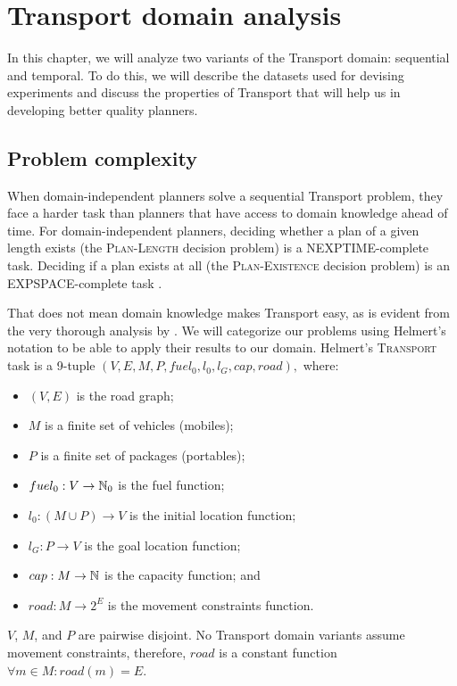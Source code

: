 \chapter{Transport domain analysis}

In this chapter, we will analyze two variants of the Transport domain: sequential and temporal. To do this, we will describe the datasets
used for devising experiments and discuss the properties of Transport
that will help us in developing better quality planners.

\section{Problem complexity}

When domain-independent planners solve a sequential Transport problem,
they face a harder task than planners that have access to domain knowledge ahead of time.
For domain-independent planners, deciding whether a plan of a given length exists
(the \textsc{Plan-Length} decision problem) is
a NEXPTIME-complete task.
Deciding if a plan exists at all (the \textsc{Plan-Existence} decision problem)
is an EXPSPACE-complete task \citep[Table~3.2]{Ghallab2004}.

That does not mean domain knowledge makes Transport easy, as is evident from
the very thorough analysis by \citet{Helmert2001, Helmert2001a}.
We will categorize our problems using Helmert's notation to
be able to apply their results to our domain.
Helmert's \textsc{Transport} task is a 9-tuple $(V, E, M, P, fuel_0, l_0, l_G, cap, road),$
where:
\begin{itemize}
\item $(V, E)$ is the road graph;
\item $M$ is a finite set of vehicles (mobiles);
\item $P$ is a finite set of packages (portables);
\item $fuel_0 : V \to \mathbb{N}_0$ is the fuel function;
\item $l_0: (M \cup P) \to V$ is the initial location function;
\item $l_G: P \to V$ is the goal location function;
\item $cap: M \to \mathbb{N}$ is the capacity function; and
\item $road: M \to 2^E$ is the movement constraints function.
\end{itemize}
$V$, $M$, and $P$ are pairwise disjoint.
No Transport domain variants assume movement constraints, therefore, $road$ is a constant
function $\forall m \in M : road(m) = E$.

